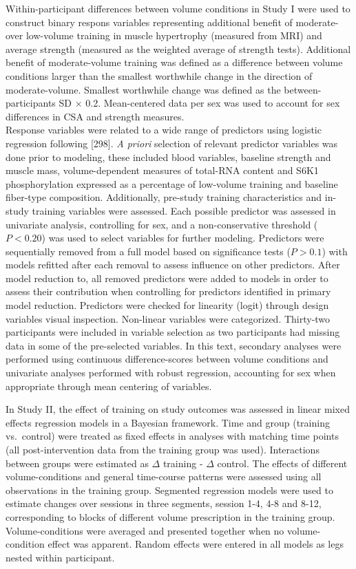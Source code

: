 \documentclass[twoside,10pt]{gihclass} %
\begin{document}
Within-participant differences between volume conditions in Study I were used to construct binary respons variables representing additional benefit of moderate- over low-volume training in muscle hypertrophy (measured from MRI) and average strength (measured as the weighted average of strength tests). Additional benefit of moderate-volume training was defined as a difference between volume conditions larger than the smallest worthwhile change in the direction of moderate-volume. Smallest worthwhile change was defined as the between-participants SD \(\times\) 0.2. Mean-centered data per sex was used to account for sex differences in CSA and strength measures.\\
Response variables were related to a wide range of predictors using logistic regression following {[}298{]}. \emph{A priori} selection of relevant predictor variables was done prior to modeling, these included blood variables, baseline strength and muscle mass, volume-dependent measures of total-RNA content and S6K1 phosphorylation expressed as a percentage of low-volume training and baseline fiber-type composition. Additionally, pre-study training characteristics and in-study training variables were assessed.
Each possible predictor was assessed in univariate analysis, controlling for sex, and a non-conservative threshold (\(P < 0.20\)) was used to select variables for further modeling.
Predictors were sequentially removed from a full model based on significance tests (\(P > 0.1\)) with models refitted after each removal to assess influence on other predictors. After model reduction to, all removed predictors were added to models in order to assess their contribution when controlling for predictors identified in primary model reduction. Predictors were checked for linearity (logit) through design variables visual inspection. Non-linear variables were categorized. Thirty-two participants were included in variable selection as two participants had missing data in some of the pre-selected variables.
In this text, secondary analyses were performed using continuous difference-scores between volume conditions and univariate analyses performed with robust regression, accounting for sex when appropriate through mean centering of variables.

In Study II, the effect of training on study outcomes was assessed in linear mixed effects regression models in a Bayesian framework.
Time and group (training vs.~control) were treated as fixed effects in analyses with matching time points (all post-intervention data from the training group was used).
Interactions between groups were estimated as \(\Delta\) training - \(\Delta\) control.
The effects of different volume-conditions and general time-course patterns were assessed using all observations in the training group.
Segmented regression models were used to estimate changes over sessions in three segments, session 1-4, 4-8 and 8-12, corresponding to blocks of different volume prescription in the training group.
Volume-conditions were averaged and presented together when no volume-condition effect was apparent.
Random effects were entered in all models as legs nested within participant.
\end{document}
